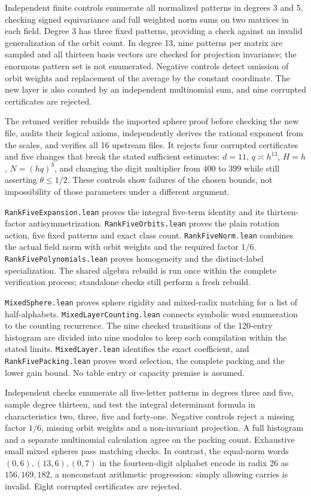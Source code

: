 \documentclass[11pt]{article}
\begin{document}
Independent finite controls enumerate all normalized patterns in
degrees 3 and 5, checking signed equivariance and full weighted norm
sums on two matrices in each field. Degree 3 has three fixed patterns,
providing a check against an invalid generalization of the orbit count.
In degree 13, nine patterns per matrix are sampled and all thirteen
basis vectors are checked for projection invariance; the enormous
pattern set is not enumerated. Negative controls detect omission of
orbit weights and replacement of the average by the constant coordinate.
The new layer is also counted by an independent multinomial sum,
and nine corrupted certificates are rejected.

The retuned verifier rebuilds the imported sphere proof before checking
the new file, audits their logical axioms, independently derives the
rational exponent from the scales, and verifies all 16 upstream files.
It rejects four corrupted certificates and five changes that break the
stated sufficient estimates: \(d=11\), \(q\asymp h^{13}\),
\(H=h\), \(N=(hq)^3\), and changing the digit multiplier from \(400\)
to \(399\) while still asserting \(\theta\le1/2\).
These controls show failures of the chosen bounds, not impossibility
of those parameters under a different argument.


\texttt{RankFiveExpansion.lean} proves the integral five-term identity
and its thirteen-factor antisymmetrization. \texttt{RankFiveOrbits.lean}
proves the plain rotation action, five fixed patterns and exact class count.
\texttt{RankFiveNorm.lean} combines the actual field norm with orbit weights
and the required factor \(1/6\). \texttt{RankFivePolynomials.lean} proves
homogeneity and the distinct-label specialization. The shared algebra
rebuild is run once within the complete verification process; standalone
checks still perform a fresh rebuild.

\texttt{MixedSphere.lean} proves sphere rigidity and mixed-radix matching
for a list of half-alphabets. \texttt{MixedLayerCounting.lean} connects
symbolic word enumeration to the counting recurrence. The nine checked
transitions of the 120-entry histogram are divided into nine modules to
keep each compilation within the stated limits. \texttt{MixedLayer.lean}
identifies the exact coefficient, and \texttt{RankFivePacking.lean}
proves word selection, the complete packing and the lower gain bound.
No table entry or capacity premise is assumed.

Independent checks enumerate all five-letter patterns in degrees three
and five, sample degree thirteen, and test the integral determinant
formula in characteristics two, three, five and forty-one. Negative
controls reject a missing factor \(1/6\), missing orbit weights and a
non-invariant projection. A full histogram and a separate multinomial
calculation agree on the packing count. Exhaustive small mixed spheres
pass matching checks. In contrast, the equal-norm words
\((0,6),(13,6),(0,7)\) in the fourteen-digit alphabet encode in radix
26 as \(156,169,182\), a nonconstant arithmetic progression: simply
allowing carries is invalid. Eight corrupted certificates are rejected.
\end{document}
